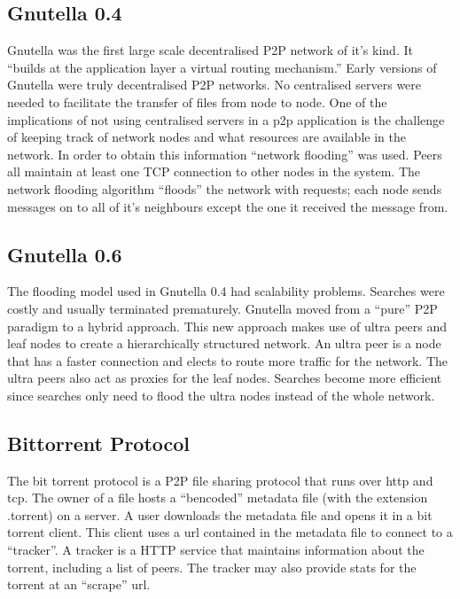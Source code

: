 \documentclass[11pt]{amsart}
\begin{document}
\subsection{Gnutella 0.4}\cite{GnutellaCase}

Gnutella was the first large scale decentralised P2P network of it's kind. It ``builds at the application layer a virtual routing mechanism.''\cite{GnutellaCase} Early versions of Gnutella were truly decentralised P2P networks. No centralised servers were needed to facilitate the transfer of files from node to node.
One of the implications of not using centralised servers in a p2p application is the challenge of keeping track of network nodes and what resources are available in the network. In order to obtain this information ``network flooding'' was used. Peers all maintain at least one TCP connection to other nodes in the system. The network flooding algorithm ``floods'' the network with requests; each node sends messages on to all of it's neighbours except the one it received the message from. 

\subsection{Gnutella 0.6}
The flooding model used in Gnutella 0.4 had scalability problems. Searches were costly and usually terminated prematurely. Gnutella moved from a ``pure'' P2P paradigm to a hybrid approach. This new approach makes use of ultra peers and leaf nodes to create a hierarchically structured network. An ultra peer is a node that has a faster connection and elects to route more traffic for the network. The ultra peers also act as proxies for the leaf nodes. Searches become more efficient since searches only need to flood the ultra nodes instead of the whole network.


\subsection{Bittorrent Protocol}\cite{Bittorrent} \cite{BittorrentSpec}

The bit torrent protocol is a P2P file sharing protocol that runs over http and tcp. The owner of a file hosts a ``bencoded'' metadata file (with the extension .torrent) on a server. A user downloads the metadata file and opens it in a bit torrent client. This client uses a url contained in the metadata file to connect to a ``tracker''. A tracker is a HTTP service that maintains information about the torrent, including a list of peers. The tracker may also provide stats for the torrent at an ``scrape'' url.
\indent 
\end{document}
